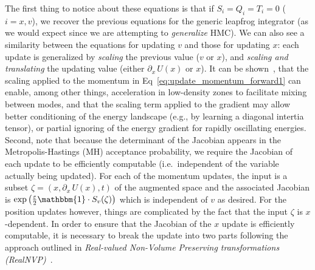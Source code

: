 \documentclass[main.tex]{subfiles}
\begin{document}
The first thing to notice about these equations is that if $S_{i} = Q_{i} = T_{i} = 0$ ($i = x, v$), we recover the
previous equations for the generic leapfrog integrator (as we would expect since we are attempting to
\emph{generalize} HMC).
%
We can also see a similarity between the equations for updating $v$ and those for updating $x$: each update is
generalized by \emph{scaling} the previous value ($v$ or $x$), and \emph{scaling and translating} the updating
value (either $\partial_{x}\,U(x)$ or $x$).
%
It can be shown~\cite{2017arXiv171109268L}, that the scaling applied to the momentum in
Eq~\ref{eq:update_momentum_forward1} can enable, among other things, acceleration in low-density zones to facilitate
mixing between modes, and that the scaling term applied to the gradient may allow better conditioning of the energy
landscape (e.g., by learning a diagonal intertia tensor), or partial ignoring of the energy gradient for rapidly
oscillating energies.
%
Second, note that because the determinant of the Jacobian appears in the Metropolis-Hastings (MH) acceptance
probability, we require the Jacobian of each update to be efficiently computable (i.e.\ independent of the variable
actually being updated).
%
For each of the momentum updates, the input is a subset $\zeta = (x, \partial_{x}\,U(x), t)$ of the augmented space and
the associated Jacobian is $\exp{\left(\frac{\eps}{2}\mathbbm{1}\cdot S_{v}(\zeta)\right)}$ which is independent of $v$
as desired.
%
For the position updates however, things are complicated by the fact that the input $\zeta$ is $x$-dependent.
%
In order to ensure that the Jacobian of the $x$ update is efficiently computable, it is necessary to break the update
into two parts following the approach outlined in \emph{Real-valued Non-Volume Preserving transformations
(RealNVP)}~\cite{dinhRealNVP}.

%
\end{document}
